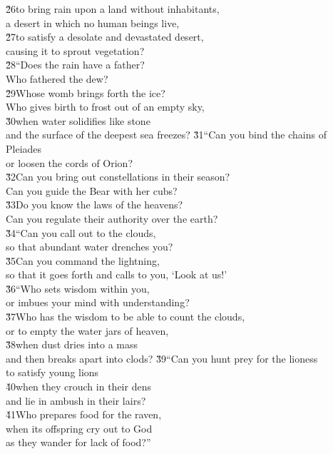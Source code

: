 \begin{poetry}
\poeml \v{26}to bring rain upon a land without inhabitants, \\
\poemll    a desert in which no human beings live, \\
\poeml \v{27}to satisfy a desolate and devastated desert, \\
\poemll    causing it to sprout vegetation? \\
\poeml \v{28}``Does the rain have a father? \\
\poemll    Who fathered the dew? \\
\poeml \v{29}Whose womb brings forth the ice? \\
\poemll    Who gives birth to frost out of an empty sky, \\
\poeml \v{30}when water solidifies like stone \\
\poemll    and the surface of the deepest sea freezes?
\poeml \v{31}``Can you bind the chains of Pleiades \\
\poemll    or loosen the cords of Orion? \\
\poeml \v{32}Can you bring out constellations in their season? \\
\poemll    Can you guide the Bear with her cubs? \\
\poeml \v{33}Do you know the laws of the heavens? \\
\poemll    Can you regulate their authority over the earth? \\
\poeml \v{34}``Can you call out to the clouds, \\
\poemll    so that abundant water drenches you? \\
\poeml \v{35}Can you command the lightning, \\
\poemll    so that it goes forth and calls to you, `Look at us!' \\
\poeml \v{36}``Who sets wisdom within you, \\
\poemll    or imbues your mind with understanding? \\
\poeml \v{37}Who has the wisdom to be able to count the clouds, \\
\poemll    or to empty the water jars of heaven, \\
\poeml \v{38}when dust dries into a mass \\
\poemll    and then breaks apart into clods?
\poeml \v{39}``Can you hunt prey for the lioness \\
\poemll    to satisfy young lions \\
\poeml \v{40}when they crouch in their dens \\
\poemll    and lie in ambush in their lairs? \\
\poeml \v{41}Who prepares food for the raven, \\
\poemll    when its offspring cry out to God \\
\poemlll       as they wander for lack of food?''
\end{poetry}

